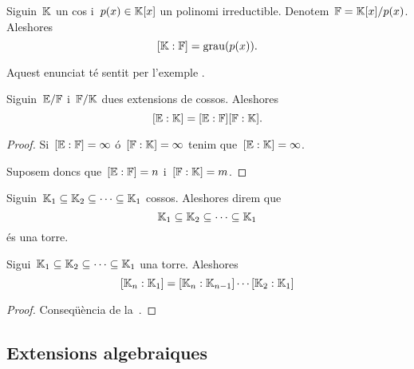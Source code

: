 \documentclass[../Apunts.tex]{subfiles}
\begin{document}
	\begin{example}
		Siguin~\(\mathbb{K}\) un cos i~\(p(x)\in\mathbb{K}[x]\) un polinomi irreductible. Denotem~\(\mathbb{F}=\mathbb{K}[x]/p(x)\). Aleshores
		\[[\mathbb{K}:\mathbb{F}]=\operatorname{grau}(p(x)).\]
		\begin{solution}
			Aquest enunciat té sentit per l'exemple . %
		\end{solution}
	\end{example}
	\begin{theorem}
		\label{thm:fórmula de les torres}
		Siguin~\(\mathbb{E}/\mathbb{F}\) i~\(\mathbb{F}/\mathbb{K}\) dues extensions de cossos. Aleshores
		\[[\mathbb{E}:\mathbb{K}]=[\mathbb{E}:\mathbb{F}][\mathbb{F}:\mathbb{K}].\]
		\begin{proof}
			Si~\([\mathbb{E}:\mathbb{F}]=\infty\) ó~\([\mathbb{F}:\mathbb{K}]=\infty\) tenim que~\([\mathbb{E}:\mathbb{K}]=\infty\).
			
			Suposem doncs que~\([\mathbb{E}:\mathbb{F}]=n\) i~\([\mathbb{F}:\mathbb{K}]=m\). %
		\end{proof}
	\end{theorem}
	\begin{definition}[Torre]
		\label{def:torre de cossos}
		Siguin~\(\mathbb{K}_{1}\subseteq\mathbb{K}_{2}\subseteq\dots\subseteq\mathbb{K}_{1}\) cossos. Aleshores direm que
		\[\mathbb{K}_{1}\subseteq\mathbb{K}_{2}\subseteq\dots\subseteq\mathbb{K}_{1}\]
		és una torre.
	\end{definition}
	\begin{corollary}
		Sigui~\(\mathbb{K}_{1}\subseteq\mathbb{K}_{2}\subseteq\dots\subseteq\mathbb{K}_{1}\) una torre. Aleshores
		\[[\mathbb{K}_{n}:\mathbb{K}_{1}]=[\mathbb{K}_{n}:\mathbb{K}_{n-1}]\cdots[\mathbb{K}_{2}:\mathbb{K}_{1}]\]
		\begin{proof}
			Conseqüència de la~.
		\end{proof}
	\end{corollary}
	\subsection{Extensions algebraiques}
	\begin{definition}
		
	\end{definition}
\end{document}
